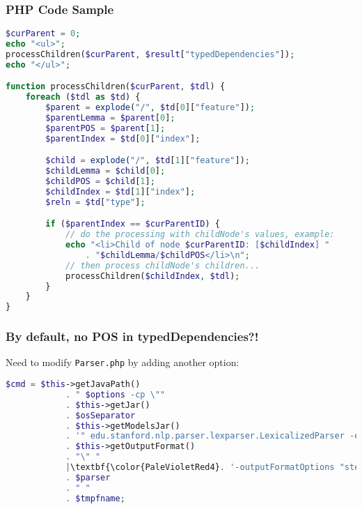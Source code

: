 \begin{frame}
\frametitle{PHP Code Sample}
    
\begin{lstlisting}[language=PHP,basicstyle=\ttfamily\footnotesize,
emph={typedDependencies, processChildren}, escapechar={|},
morekeywords={function}]
$curParent = 0;
echo "<ul>";
processChildren($curParent, $result["typedDependencies"]);
echo "</ul>";

function processChildren($curParent, $tdl) {
    foreach ($tdl as $td) {
        $parent = explode("/", $td[0]["feature"]);
        $parentLemma = $parent[0];
        $parentPOS = $parent[1];
        $parentIndex = $td[0]["index"];

        $child = explode("/", $td[1]["feature"]);
        $childLemma = $child[0];
        $childPOS = $child[1];
        $childIndex = $td[1]["index"];
        $reln = $td["type"];

        if ($parentIndex == $curParentID) {
            // do the processing with childNode's values, example:
            echo "<li>Child of node $curParentID: [$childIndex] " 
                . "$childLemma/$childPOS</li>\n";
            // then process childNode's children...
            processChildren($childIndex, $tdl);
        }
    }
}
\end{lstlisting}

\end{frame}


\begin{frame}[fragile]
\frametitle{By default, no POS in typedDependencies?!}
    
Need to modify \texttt{Parser.php} by adding another option:

\begin{lstlisting}[language=PHP,gobble=8,escapechar=|,basicstyle=\ttfamily\small,frame=lines]
        $cmd = $this->getJavaPath()
            . " $options -cp \""
            . $this->getJar()
            . $osSeparator
            . $this->getModelsJar()
            . '" edu.stanford.nlp.parser.lexparser.LexicalizedParser -encoding UTF-8 -outputFormat "'
            . $this->getOutputFormat()
            . "\" "
            |\textbf{\color{PaleVioletRed4}. '-outputFormatOptions "stem,\textcolor{mLightBrown}{includeTags}" '}|
            . $parser
            . " "
            . $tmpfname;
\end{lstlisting}
\end{frame}



